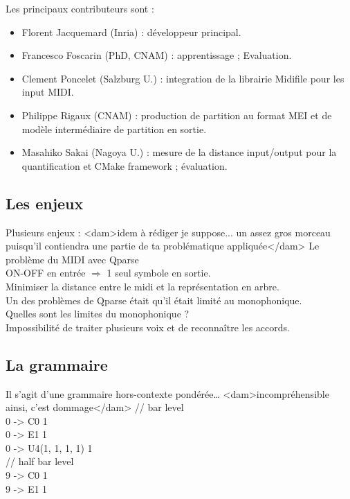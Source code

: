 Les principaux contributeurs sont :
\begin{itemize}
	\item Florent Jacquemard (Inria) : développeur principal.
	\item Francesco Foscarin (PhD, CNAM) : apprentissage ; Evaluation.
	\item Clement Poncelet (Salzburg U.) : integration de la librairie Midifile
        pour les input MIDI.
	\item Philippe Rigaux (CNAM) : production de partition au format MEI et de
        modèle intermédiaire de partition en sortie.
	\item Masahiko Sakai (Nagoya U.) : mesure de la distance input/output pour
        la quantification et CMake framework ; évaluation.
\end{itemize}

\subsection*{Les enjeux}
Plusieurs enjeux : <dam>idem à rédiger je suppose... un assez gros morceau
puisqu'il contiendra une partie de ta problématique appliquée</dam>
Le problème du MIDI avec Qparse\\
ON-OFF en entrée $\Rightarrow$ 1 seul symbole en sortie.\\
Minimiser la distance entre le midi et la représentation en arbre.\\
Un des problèmes de Qparse était qu’il était limité au monophonique.\\
Quelles sont les limites du monophonique ?\\
Impossibilité de traiter plusieurs voix et de reconnaître les accords.

\subsection*{La grammaire}
Il s’agit d’une grammaire hors-contexte pondérée…
<dam>incompréhensible ainsi, c'est dommage</dam>
// bar level\\
0 -> C0                1\\
0 -> E1                1\\
0 -> U4(1, 1, 1, 1)    1\\

// half bar level\\
9 -> C0                1\\
9 -> E1                1\\

